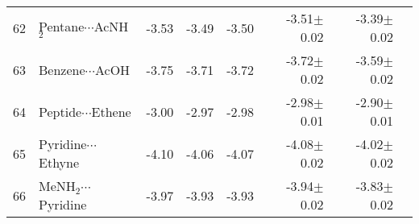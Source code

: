 \begin{longtable}{llrrrrrr}
62 & Pentane$\cdots$AcNH$_2$ & -3.53 & -3.49 & -3.50 & -3.51$\pm$0.02 & -3.39$\pm$0.02 \\
63 & Benzene$\cdots$AcOH & -3.75 & -3.71 & -3.72 & -3.72$\pm$0.02 & -3.59$\pm$0.02 \\
64 & Peptide$\cdots$Ethene & -3.00 & -2.97 & -2.98 & -2.98$\pm$0.01 & -2.90$\pm$0.01 \\
65 & Pyridine$\cdots$Ethyne & -4.10 & -4.06 & -4.07 & -4.08$\pm$0.02 & -4.02$\pm$0.02 \\
66 & MeNH$_2$$\cdots$Pyridine & -3.97 & -3.93 & -3.93 & -3.94$\pm$0.02 & -3.83$\pm$0.02 \\
\end{longtable}
